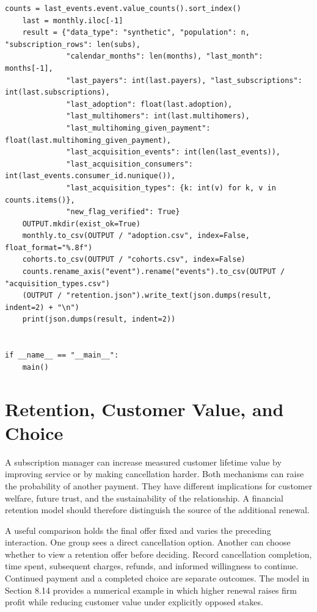 \begin{Verbatim}[breaklines,breakanywhere,fontsize=\small]
    counts = last_events.event.value_counts().sort_index()
    last = monthly.iloc[-1]
    result = {"data_type": "synthetic", "population": n, "subscription_rows": len(subs),
              "calendar_months": len(months), "last_month": months[-1],
              "last_payers": int(last.payers), "last_subscriptions": int(last.subscriptions),
              "last_adoption": float(last.adoption),
              "last_multihomers": int(last.multihomers),
              "last_multihoming_given_payment": float(last.multihoming_given_payment),
              "last_acquisition_events": int(len(last_events)),
              "last_acquisition_consumers": int(last_events.consumer_id.nunique()),
              "last_acquisition_types": {k: int(v) for k, v in counts.items()},
              "new_flag_verified": True}
    OUTPUT.mkdir(exist_ok=True)
    monthly.to_csv(OUTPUT / "adoption.csv", index=False, float_format="%.8f")
    cohorts.to_csv(OUTPUT / "cohorts.csv", index=False)
    counts.rename_axis("event").rename("events").to_csv(OUTPUT / "acquisition_types.csv")
    (OUTPUT / "retention.json").write_text(json.dumps(result, indent=2) + "\n")
    print(json.dumps(result, indent=2))


if __name__ == "__main__":
    main()
\end{Verbatim}

\hypertarget{M04-retention-customer-value-and-choice}{%
\section{Retention, Customer Value, and
Choice}\label{M04-retention-customer-value-and-choice}}

\noindent \noindent A subscription manager can increase measured customer lifetime
value by improving service or by making cancellation harder. Both
mechanisms can raise the probability of another payment. They have
different implications for customer welfare, future trust, and the
sustainability of the relationship. A financial retention model should
therefore distinguish the source of the additional renewal.

A useful comparison holds the final offer fixed and varies the preceding
interaction. One group sees a direct cancellation option. Another can
choose whether to view a retention offer before deciding. Record
cancellation completion, time spent, subsequent charges, refunds, and
informed willingness to continue. Continued payment and a completed
choice are separate outcomes. The model in Section 8.14 provides a
numerical example in which higher renewal raises firm profit while
reducing customer value under explicitly opposed stakes.

